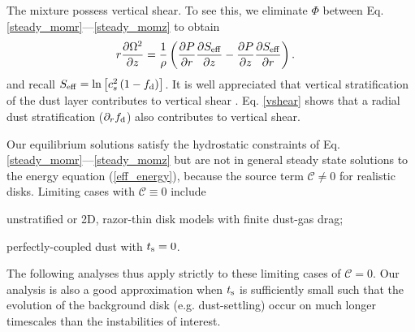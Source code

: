The mixture possess vertical shear. To see this, we eliminate $\Phi$
between Eq. \ref{steady_momr}---\ref{steady_momz} to 
obtain 
\begin{align}\label{vshear}
  r\frac{\p \Omega^2}{\p z} 
   &= \frac{1}{\rho}\left(\frac{\p P}{\p r}\frac{\p \seff}{\p z} -\frac{\p
    P}{\p z}\frac{\p \seff}{\p r} \right).%
\end{align}
and recall $S_\mathrm{eff} = \ln{\left[c_s^2\left(1-f_\mathrm{d}\right)\right]}$. It is well appreciated that 
vertical stratification of the dust layer contributes to vertical shear
\citep{chiang08}. Eq. \ref{vshear} shows that a radial dust
stratification ($\partial_rf_\mathrm{d}$) also contributes to vertical shear.  



Our equilibrium solutions satisfy the hydrostatic constraints of
Eq. \ref{steady_momr}---\ref{steady_momz} but are not in general
steady state solutions to the energy 
equation (\ref{eff_energy}), because the source term $\mathcal{C} \ne0$ for realistic disks.  
Limiting cases with $\mathcal{C} \equiv 0$ include \begin{inparaenum}[1)] 
\item 
  unstratified or 2D, razor-thin disk models with finite dust-gas drag; %
\item 
  perfectly-coupled dust with $t_\mathrm{s}=0$. %
\end{inparaenum} 
The following analyses thus apply strictly to these limiting cases of
$\mathcal{C} = 0$.  Our analysis is also a good approximation when
$t_\mathrm{s}$ is sufficiently small such that the evolution of the background disk (e.g. dust-settling) 
occur on much longer timescales than the instabilities of interest.   








